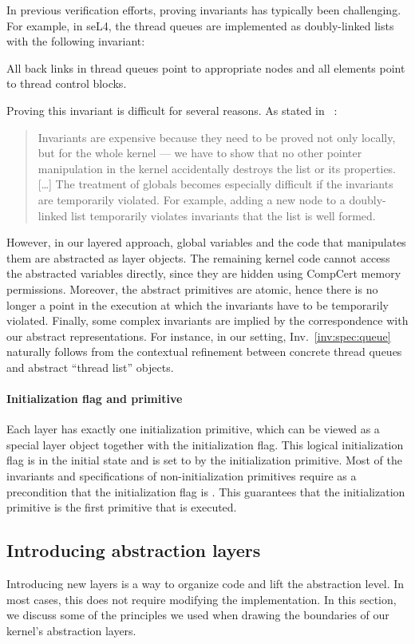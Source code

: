 In previous verification efforts,
proving invariants has typically been challenging.
For example, in seL4, the thread queues are implemented as doubly-linked lists with 
the following invariant:
\begin{invariant}
\label{inv:spec:queue}
 All back links in thread queues point to appropriate nodes and all elements point
 to thread control blocks.
\end{invariant}
Proving this invariant is difficult
for several reasons.
As stated in ~\cite{klein2009sel4}:
\begin{quote}
  Invariants are expensive because
  they need to be proved not only locally,
  but for the whole kernel ---
  we have to show that no other pointer manipulation in the kernel
  accidentally destroys the list or its properties.
  [\ldots]
  The treatment of globals becomes especially difficult
  if the invariants are temporarily violated.
  For example,
  adding a new node to a doubly-linked list
  temporarily violates invariants that the list is well formed.
\end{quote}
However, in our layered approach,
global variables and the code that manipulates them
are abstracted as layer objects.
The remaining kernel code cannot access
the abstracted variables directly,
since they are hidden using CompCert memory permissions.
Moreover,
the abstract primitives are atomic,
hence there is no longer a point in the execution
at which the invariants have to be temporarily violated.
Finally, some complex invariants are implied by
the correspondence with our abstract representations.
For instance, in our setting, Inv.~\ref{inv:spec:queue} 
naturally follows from the contextual refinement between
concrete thread queues and
abstract ``thread list'' objects.

\paragraph{Initialization flag and primitive}
Each layer has exactly one
initialization primitive, which can be viewed as a special
layer object together with the initialization flag. This logical initialization flag 
is  in the initial state and is set to  by the initialization 
primitive. Most of the invariants and specifications of
non-initialization primitives require as a precondition that
the initialization flag is .
This guarantees that the initialization primitive is the first primitive that is executed. 

\subsection{Introducing abstraction layers}
Introducing new layers is a way to organize code and lift the abstraction level.
In most cases, this does not require modifying the implementation.
In this section,
we discuss some of the principles we used
when drawing the boundaries
of our kernel's abstraction layers.

